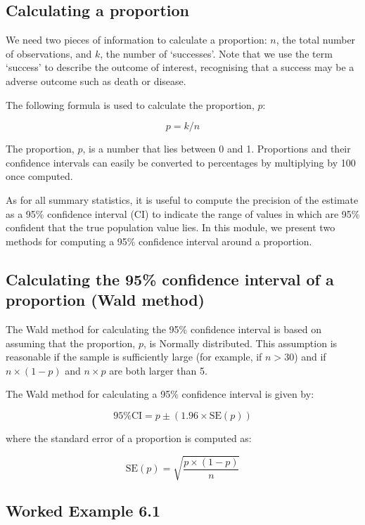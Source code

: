 \documentclass[
  a4paper,
]{memoir}
\begin{document}
\subsection{Calculating a proportion}\label{calculating-a-proportion}

We need two pieces of information to calculate a proportion: \(n\), the
total number of observations, and \(k\), the number of `successes'. Note
that we use the term `success' to describe the outcome of interest,
recognising that a success may be a adverse outcome such as death or
disease.

The following formula is used to calculate the proportion, \(p\):

\[ p = k / n \]

The proportion, \(p\), is a number that lies between 0 and 1.
Proportions and their confidence intervals can easily be converted to
percentages by multiplying by 100 once computed.

As for all summary statistics, it is useful to compute the precision of
the estimate as a 95\% confidence interval (CI) to indicate the range of
values in which are 95\% confident that the true population value lies.
In this module, we present two methods for computing a 95\% confidence
interval around a proportion.

\subsection{Calculating the 95\% confidence interval of a proportion
(Wald
method)}\label{calculating-the-95-confidence-interval-of-a-proportion-wald-method}

The Wald method for calculating the 95\% confidence interval is based on
assuming that the proportion, \(p\), is Normally distributed. This
assumption is reasonable if the sample is sufficiently large (for
example, if \(n>30\)) and if \(n \times (1-p)\) and \(n \times p\) are
both larger than 5.

The Wald method for calculating a 95\% confidence interval is given by:

\[\text{95\% CI} = p \pm (1.96 \times \text{SE}(p))\]

where the standard error of a proportion is computed as:

\[\text{SE}(p) = \sqrt{\frac{p \times (1 - p)}{n}}\]

\subsection{Worked Example 6.1}\label{worked-example-6.1}
\end{document}
